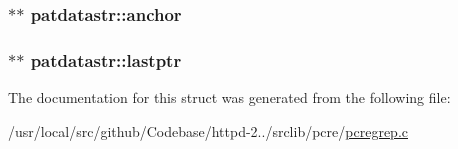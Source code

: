 \subsubsection[{\texorpdfstring{anchor}{anchor}}]{$\ast$$\ast$ patdatastr\+::anchor}\hypertarget{structpatdatastr_a6ac27ae344e2e27c4a4b69de2d9ccdc6}{}\label{structpatdatastr_a6ac27ae344e2e27c4a4b69de2d9ccdc6}
\subsubsection[{\texorpdfstring{lastptr}{lastptr}}]{$\ast$$\ast$ patdatastr\+::lastptr}\hypertarget{structpatdatastr_a7a587ec22f33290ab99ea2320b3d45e1}{}\label{structpatdatastr_a7a587ec22f33290ab99ea2320b3d45e1}


The documentation for this struct was generated from the following file\+:\begin{DoxyCompactItemize}
\item 
/usr/local/src/github/\+Codebase/httpd-\/2../srclib/pcre/\hyperlink{pcregrep_8c}{pcregrep.\+c}\end{DoxyCompactItemize}
